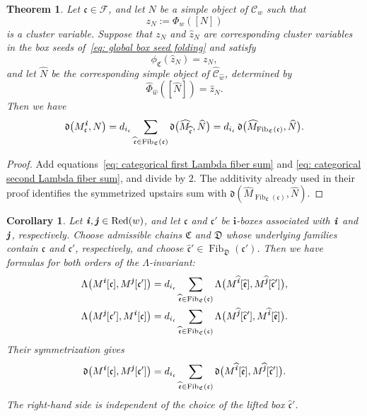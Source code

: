 \documentclass[12pt, leqno]{amsart}
\numberwithin{equation}{section}
\theoremstyle{plain}
\newtheorem{theorem}[lemma]{Theorem}
\newtheorem{corollary}[lemma]{Corollary}
\theoremstyle{definition}
\newcommand{\seteq}{\mathbin{:=}}
\newcommand{\de}{\mathfrak{d}}
\newcommand{\ii}{ \textbf{\textit{i}}}
\newcommand{\jj}{ \textbf{\textit{j}}}
\newcommand{\Fib}{\operatorname{Fib}}
\newcommand{\hM}{\widehat{M}}
\newcommand{\hN}{\widehat{N}}
\newcommand{\hw}{\widehat{w}}
\newcommand{\hz}{\widehat{z}}
\newcommand{\hii}{{\widehat{\ii}}}
\newcommand{\hjj}{{\widehat{\jj}}}
\newcommand{\frakC}{\mathfrak{C}}
\newcommand{\frakD}{\mathfrak{D}}
\newcommand{\frakc}{\mathfrak{c}}
\newcommand{\frake}{\mathfrak{e}}
\newcommand{\hfrakc}{\widehat{\frakc}}
\newcommand{\hfrake}{\widehat{\frake}}
\newcommand{\bfi}{\mathbf{i}}
\newcommand{\calF}{\mathcal{F}}
\newcommand{\scrC}{\mathscr{C}}
\newcommand{\Red}{\mathrm{Red}}
\begin{document}
\begin{theorem}\label{thm: categorical folding of d-invariants}
Let \(\frakc\in\calF\), and let \(N\) be a simple object of
\(\scrC_w\) such that
\[
z_N\seteq\Phi_w([N])
\]
is a cluster variable. Suppose that \(z_N\) and \(\hz_N\) are corresponding cluster variables
in the box seeds of~\eqref{eq: global box seed folding} and satisfy 
\[
\phi_{\frakC}(\hz_N)=z_N,
\]
and let \(\hN\) be the corresponding simple object of
\(\widehat{\scrC}_{\hw}\), determined by
\[
\widehat\Phi_{\hw}([\hN]) = \hz_N.
\]
Then we have 
\begin{equation}\label{eq: categorical fiber sum formula}
\de\bigl(M_\frakc^\ii,N\bigr) = d_{i_\frakc} \sum_{\hfrakc\in\Fib_{\frakC}(\frakc)} \de\bigl(\hM_{\hfrakc},\hN\bigr) = d_{i_\frakc}\, \de\bigl(\hM_{\Fib_{\frakC}(\frakc)},\hN\bigr).
\end{equation}
\end{theorem}

\begin{proof}
Add equations~\eqref{eq: categorical first Lambda fiber sum} and
\eqref{eq: categorical second Lambda fiber sum}, and divide by $2$.
The additivity already used in their proof identifies the
symmetrized upstairs sum with
\(\de(\hM_{\Fib_{\frakC}(\frakc)},\hN)\). %
\end{proof}

\begin{corollary}\label{cor: folding of d-values between box modules}
Let \(\ii,\jj\in\Red(w)\), and let \(\frakc\) and \(\frakc'\) be
\(\bfi\)-boxes associated with \(\ii\) and \(\jj\), respectively.
Choose admissible chains \(\frakC\) and \(\frakD\) whose underlying
families contain \(\frakc\) and \(\frakc'\), respectively,
and choose
$\hfrakc'\in\Fib_{\frakD}(\frakc')$.
Then we have formulas for both orders of the \(\Lambda\)-invariant:
\begin{align}
\label{eq: folded first Lambda between box modules}
\Lambda\bigl(M^\ii[\frakc],M^\jj[\frakc']\bigr)
&=d_{i_\frakc}\sum_{\hfrake\in\Fib_{\frakC}(\frakc)}
\Lambda\bigl(M^\hii[\hfrake],M^\hjj[\hfrakc']\bigr),\\
\label{eq: folded second Lambda between box modules}
\Lambda\bigl(M^\jj[\frakc'],M^\ii[\frakc]\bigr)
&=d_{i_\frakc}\sum_{\hfrake\in\Fib_{\frakC}(\frakc)}
\Lambda\bigl(M^\hjj[\hfrakc'],M^\hii[\hfrake]\bigr).
\end{align}
Their symmetrization gives
\begin{equation}\label{eq: folded d-value between box modules}
\de\bigl( M^\ii[\frakc], M^\jj[\frakc'] \bigr)
= d_{i_\frakc} \sum_{\hfrake\in\Fib_{\frakC}(\frakc)} \de\bigl( M^\hii[\hfrake], M^\hjj[\hfrakc'] \bigr).
\end{equation}
The right-hand side is independent of the choice of the lifted box \(\hfrakc'\).
\end{corollary}
\end{document}
